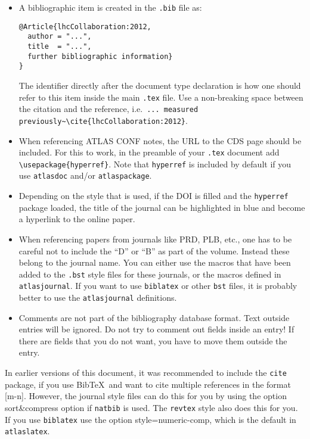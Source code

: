 \documentclass[UKenglish,texlive=2013]{latex/atlasdoc}
\newcommand*{\BibTeX}{Bib\TeX}
\newcommand{\File}[1]{\texttt{#1}\xspace}
\newcommand{\Option}[1]{\textsf{#1}\xspace}
\newcommand{\Package}[1]{\texttt{#1}\xspace}
\begin{document}
\begin{itemize}
\item A bibliographic item is created in the \File{.bib} file as:
\begin{verbatim}
@Article{lhcCollaboration:2012,
  author = "...",
  title  = "...",
  further bibliographic information}
}
\end{verbatim}
  The identifier directly after the document type declaration is how one should refer to this item inside the main \File{.tex} file.
  Use a non-breaking space between the citation and the reference, i.e.\
  \verb|... measured previously~\cite{lhcCollaboration:2012}|.
\item When referencing ATLAS CONF notes, the URL to the CDS page should be included.
  For this to work, in the preamble of your \File{.tex} document add
  \texttt{\textbackslash usepackage\{hyperref\}}.
  Note that \Package{hyperref} is included by default if you use \Package{atlasdoc} and/or \Package{atlaspackage}.
\item Depending on the style that is used,
  if the DOI is filled and the \texttt{hyperref} package loaded, 
  the title of the journal can be highlighted in blue and become a hyperlink to the online paper.
\item When referencing papers from journals like PRD, PLB, etc.,
  one has to be careful not to include the \enquote{D} or \enquote{B} as part of the volume.
  Instead these belong to the journal name. 
  You can either use the macros that have been added to the \File{.bst} style files for these journals, or
  the macros defined in \Package{atlasjournal}.
  If you want to use \Package{biblatex} or other \File{bst} files, it is probably better to use the
  \Package{atlasjournal} definitions.
\item Comments are not part of the bibliography database format. Text outside entries will be ignored.
  Do not try to comment out fields inside an entry!
  If there are fields that you do not want, you have to move them outside the entry.
\end{itemize}

In earlier versions of this document, it was recommended to include the \Package{cite} package, 
if you use \BibTeX\ and want to cite multiple references in the format [m-n].
However, the journal style files can do this for you by using the option \Option{sort\&compress} option if \Package{natbib} is used.
The \texttt{revtex} style also does this for you.
If you use \texttt{biblatex} use the option \Option{style=numeric-comp},
which is the default in \Package{atlaslatex}.
\end{document}
